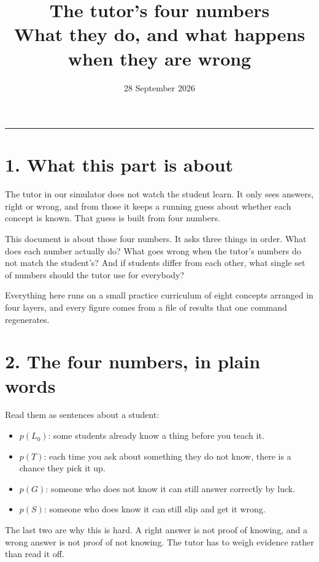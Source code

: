 \documentclass[11pt]{article}
\title{\vspace{-1.2cm}\textbf{The tutor's four numbers}\\[3pt]
\large What they do, and what happens when they are wrong}
\author{}
\date{\small 28 September 2026}
\begin{document}
\maketitle
\vspace{-1.0cm}
\noindent\rule{\textwidth}{0.4pt}

\section*{1. What this part is about}

The tutor in our simulator does not watch the student learn. It only sees
answers, right or wrong, and from those it keeps a running guess about
whether each concept is known. That guess is built from four numbers.

This document is about those four numbers. It asks three things in order.
What does each number actually do? What goes wrong when the tutor's
numbers do not match the student's? And if students differ from each
other, what single set of numbers should the tutor use for everybody?

Everything here runs on a small practice curriculum of eight concepts
arranged in four layers, and every figure comes from a file of results
that one command regenerates.

\section*{2. The four numbers, in plain words}



\noindent Read them as sentences about a student:

\begin{itemize}\itemsep2pt
\item $p(L_0)$: some students already know a thing before you teach it.
\item $p(T)$: each time you ask about something they do not know, there
is a chance they pick it up.
\item $p(G)$: someone who does not know it can still answer correctly by
luck.
\item $p(S)$: someone who does know it can still slip and get it wrong.
\end{itemize}

\noindent The last two are why this is hard. A right answer is not proof
of knowing, and a wrong answer is not proof of not knowing. The tutor has
to weigh evidence rather than read it off.
\end{document}
